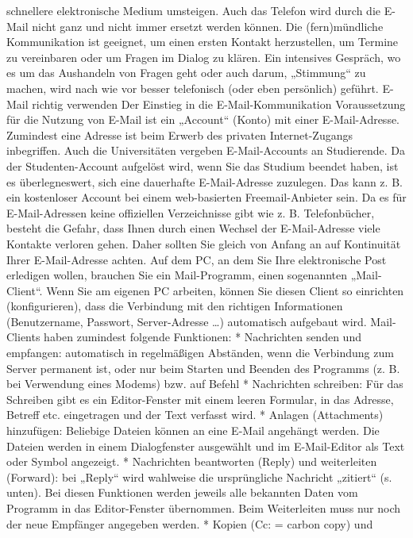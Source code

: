 \documentclass[]{book}
\theoremstyle{definition}
\theoremstyle{definition}
\theoremstyle{definition}
\theoremstyle{remark}
\begin{document}
schnellere elektronische Medium umsteigen. Auch das Telefon wird durch
die E-Mail nicht ganz und nicht immer ersetzt werden können. Die
(fern)mündliche Kommunikation ist geeignet, um einen ersten Kontakt
herzustellen, um Termine zu vereinbaren oder um Fragen im Dialog zu
klären. Ein intensives Gespräch, wo es um das Aushandeln von Fragen geht
oder auch darum, „Stimmung`` zu machen, wird nach wie vor besser
telefonisch (oder eben persönlich) geführt. E-Mail richtig verwenden Der
Einstieg in die E-Mail-Kommunikation Voraussetzung für die Nutzung von
E-Mail ist ein „Account`` (Konto) mit einer E-Mail-Adresse. Zumindest
eine Adresse ist beim Erwerb des privaten Internet-Zugangs inbegriffen.
Auch die Universitäten vergeben E-Mail-Accounts an Studierende. Da der
Studenten-Account aufgelöst wird, wenn Sie das Studium beendet haben,
ist es überlegneswert, sich eine dauerhafte E-Mail-Adresse zuzulegen.
Das kann z. B. ein kostenloser Account bei einem web-basierten
Freemail-Anbieter sein. Da es für E-Mail-Adressen keine offiziellen
Verzeichnisse gibt wie z. B. Telefonbücher, besteht die Gefahr, dass
Ihnen durch einen Wechsel der E-Mail-Adresse viele Kontakte verloren
gehen. Daher sollten Sie gleich von Anfang an auf Kontinuität Ihrer
E-Mail-Adresse achten. Auf dem PC, an dem Sie Ihre elektronische Post
erledigen wollen, brauchen Sie ein Mail-Programm, einen sogenannten
„Mail-Client``. Wenn Sie am eigenen PC arbeiten, können Sie diesen
Client so einrichten (konfigurieren), dass die Verbindung mit den
richtigen Informationen (Benutzername, Passwort, Server-Adresse
\ldots{}) automatisch aufgebaut wird. Mail-Clients haben zumindest
folgende Funktionen: * Nachrichten senden und empfangen: automatisch in
regelmäßigen Abständen, wenn die Verbindung zum Server permanent ist,
oder nur beim Starten und Beenden des Programms (z. B. bei Verwendung
eines Modems) bzw. auf Befehl * Nachrichten schreiben: Für das Schreiben
gibt es ein Editor-Fenster mit einem leeren Formular, in das Adresse,
Betreff etc. eingetragen und der Text verfasst wird. * Anlagen
(Attachments) hinzufügen: Beliebige Dateien können an eine E-Mail
angehängt werden. Die Dateien werden in einem Dialogfenster ausgewählt
und im E-Mail-Editor als Text oder Symbol angezeigt. * Nachrichten
beantworten (Reply) und weiterleiten (Forward): bei „Reply`` wird
wahlweise die ursprüngliche Nachricht „zitiert`` (s. unten). Bei diesen
Funktionen werden jeweils alle bekannten Daten vom Programm in das
Editor-Fenster übernommen. Beim Weiterleiten muss nur noch der neue
Empfänger angegeben werden. * Kopien (Cc: = carbon copy) und
\end{document}
